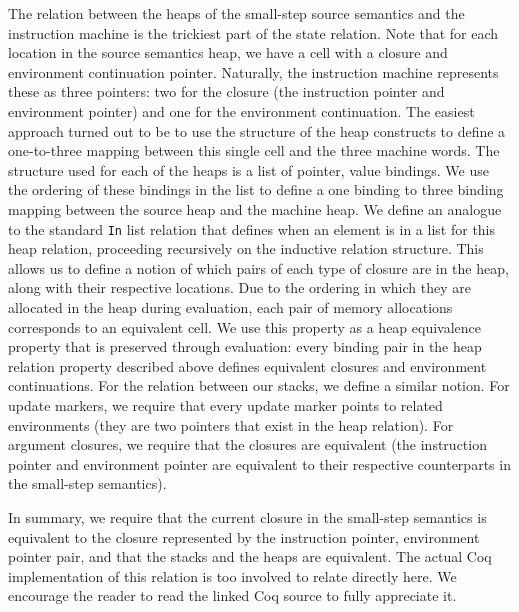 The relation between the heaps of the small-step source semantics and the
instruction machine is the trickiest part of the state relation. Note that for
each location in the source semantics heap, we have a cell with a closure and
environment continuation pointer. Naturally, the instruction machine represents
these as three pointers: two for the closure (the instruction pointer and
environment pointer) and one for the environment continuation. The easiest
approach turned out to be to use the structure of the heap constructs to define a
one-to-three mapping between this single cell and the three machine words. The
structure used for each of the heaps is a list of pointer, value bindings.
We use the ordering of these bindings in the list to define a one binding to
three binding mapping between the source heap and the machine heap. We define an
analogue to the standard \texttt{In} list relation that defines when an element
is in a list for this heap relation, proceeding recursively on the inductive
relation structure. This allows us to define a notion of which pairs of each
type of closure are in the heap, along with their respective locations. Due to
the ordering in which they are allocated in the heap during evaluation, each pair of
memory allocations corresponds to an equivalent cell. We use this property 
as a heap equivalence property that is preserved through evaluation:
every binding pair in the heap relation property described above defines
equivalent closures and environment continuations. For the relation between our
stacks, we define a similar notion. For update markers, we require that every
update marker points to related environments (they are two pointers that exist
in the heap relation). For argument closures, we require that the closures are
equivalent (the instruction pointer and environment pointer are equivalent to
their respective counterparts in the small-step semantics). 

In summary, we require that the current closure in the small-step semantics is
equivalent to the closure represented by the instruction pointer, environment
pointer pair, and that the stacks and the heaps are equivalent. The actual Coq
implementation of this relation is too involved to relate directly here. We
encourage the reader to read the linked Coq source to fully appreciate it.

